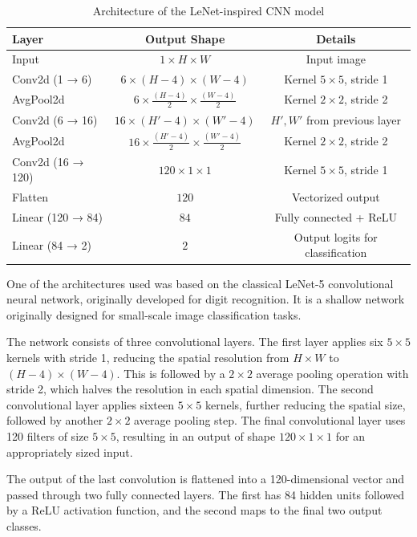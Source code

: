\documentclass{pracalicmgr}
\begin{document}
\begin{table}[h]
\centering
\caption{Architecture of the LeNet-inspired CNN model}
\label{tab:lenet_architecture}
\begin{tabular}{|l|c|c|}
\hline
\textbf{Layer} & \textbf{Output Shape} & \textbf{Details} \\
\hline
Input & \(1 \times H \times W\) & Input image \\
\hline
Conv2d (1 → 6) & \(6 \times (H-4) \times (W-4)\) & Kernel \(5 \times 5\), stride 1 \\
AvgPool2d & \(6 \times \frac{(H-4)}{2} \times \frac{(W-4)}{2}\) & Kernel \(2 \times 2\), stride 2 \\
\hline
Conv2d (6 → 16) & \(16 \times (H'-4) \times (W'-4)\) & \(H', W'\) from previous layer \\
AvgPool2d & \(16 \times \frac{(H'-4)}{2} \times \frac{(W'-4)}{2}\) & Kernel \(2 \times 2\), stride 2 \\
\hline
Conv2d (16 → 120) & \(120 \times 1 \times 1\) & Kernel \(5 \times 5\), stride 1 \\
\hline
Flatten & \(120\) & Vectorized output \\
Linear (120 → 84) & \(84\) & Fully connected + ReLU \\
Linear (84 → 2) & \(2\) & Output logits for classification \\
\hline
\end{tabular}
\end{table}

One of the architectures used was based on the classical LeNet-5 convolutional neural network, originally developed for digit recognition. It is a shallow network originally designed for small-scale image classification tasks.

The network consists of three convolutional layers. The first layer applies six \( 5 \times 5 \) kernels with stride 1, reducing the spatial resolution from \( H \times W \) to \( (H - 4) \times (W - 4) \). This is followed by a \( 2 \times 2 \) average pooling operation with stride 2, which halves the resolution in each spatial dimension. The second convolutional layer applies sixteen \( 5 \times 5 \) kernels, further reducing the spatial size, followed by another \( 2 \times 2 \) average pooling step. The final convolutional layer uses 120 filters of size \( 5 \times 5 \), resulting in an output of shape \( 120 \times 1 \times 1 \) for an appropriately sized input.

The output of the last convolution is flattened into a 120-dimensional vector and passed through two fully connected layers. The first has 84 hidden units followed by a ReLU activation function, and the second maps to the final two output classes.
\end{document}
